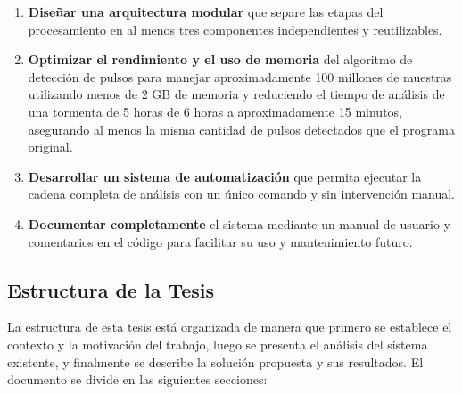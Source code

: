\documentclass[12pt,a4paper]{article}
\begin{document}
\begin{enumerate}
    \item \textbf{Diseñar una arquitectura modular} que separe las etapas del procesamiento en al menos tres componentes independientes y reutilizables.

    \item \textbf{Optimizar el rendimiento y el uso de memoria} del algoritmo de detección de pulsos para manejar aproximadamente 100 millones de muestras utilizando menos de 2 GB de memoria y reduciendo el tiempo de análisis de una tormenta de 5 horas de 6 horas a aproximadamente 15 minutos, asegurando al menos la misma cantidad de pulsos detectados que el programa original.

    \item \textbf{Desarrollar un sistema de automatización} que permita ejecutar la cadena completa de análisis con un único comando y sin intervención manual.

    \item \textbf{Documentar completamente} el sistema mediante un manual de usuario y comentarios en el código para facilitar su uso y mantenimiento futuro.
\end{enumerate}

\subsection{Estructura de la Tesis}
\lhead{}

La estructura de esta tesis está organizada de manera que primero se establece el contexto y la motivación del trabajo, luego se presenta el análisis del sistema existente, y finalmente se describe la solución propuesta y sus resultados. El documento se divide en las siguientes secciones:
\end{document}
